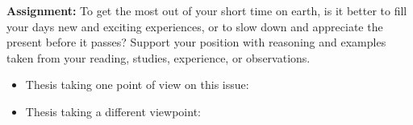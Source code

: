 \begin{enumerate}
\textbf{Assignment:} To get the most out of your short time on earth, is it better to fill your days new and exciting experiences, or to slow down and appreciate the present before it passes? Support your position with reasoning and examples taken from your reading, studies, experience, or observations.

\begin{spacing}{1.5}
\begin{itemize}
\item Thesis taking one point of view on this issue: \hrulefill

\hrulefill

\item Thesis taking a different viewpoint: \hrulefill

\hrulefill
\end{itemize}
\end{spacing}
\end{enumerate} 